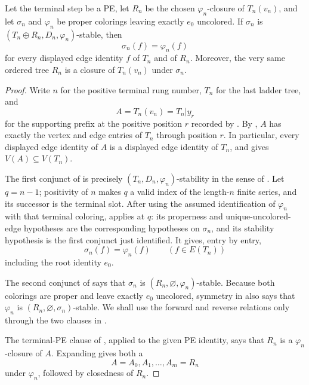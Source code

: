 \begin{lemma}
Let the terminal step be a PE, let $R_n$ be the chosen
$\varphi_n$-closure of $T_n(v_n)$, and let $\sigma_n$ and
$\varphi_n$ be proper colorings leaving exactly $e_0$ uncolored.
If $\sigma_n$ is
$(T_n\oplus R_n,D_n,\varphi_n)$-stable, then
\[
 \sigma_n(f)=\varphi_n(f)
\]
for every displayed edge identity $f$ of $T_n$ and of $R_n$.
Moreover, the very same ordered tree $R_n$ is a closure of
$T_n(v_n)$ under $\sigma_n$.
\end{lemma}
\begin{proof}
Write $n$ for the positive terminal rung number, $T_n$ for the last ladder
tree, and
\[
 A=T_n(v_n)=T_n|y_r
\]
for the supporting prefix at the positive position $r$ recorded by
.  By , $A$ has exactly
the vertex and edge entries of $T_n$ through position $r$.  In particular,
every displayed edge identity of $A$ is a displayed edge identity of $T_n$,
and  gives $V(A)\subseteq V(T_n)$.

The first conjunct of  is precisely
$(T_n,D_n,\varphi_n)$-stability in the sense of
.  Let $q=n-1$; positivity of $n$ makes $q$ a valid
index of the length-$n$ finite series, and its successor is the terminal
slot.  After using the assumed identification of $\varphi_n$ with that
terminal coloring,  applies at $q$: its
properness and unique-uncolored-edge hypotheses are the corresponding
hypotheses on $\sigma_n$, and its stability hypothesis is the first
conjunct just identified.  It gives, entry by entry,
\[
 \sigma_n(f)=\varphi_n(f)\qquad(f\in E(T_n))
                                                               \tag{1}
\]
including the root identity $e_0$.

The second conjunct of  says that
$\sigma_n$ is $(R_n,\varnothing,\varphi_n)$-stable.  Because both
colorings are proper and leave exactly $e_0$ uncolored, symmetry in
 also says that $\varphi_n$ is
$(R_n,\varnothing,\sigma_n)$-stable.  We shall use the forward and reverse
relations only through the two clauses in .

The terminal-PE clause of , applied to the given PE
identity, says that $R_n$ is a $\varphi_n$-closure of $A$.  Expanding
 gives both a
\[
 A=A_0,A_1,\ldots,A_m=R_n
                                                               \tag{2}
\]
under $\varphi_n$, followed by closedness of $R_n$.


\end{proof}

